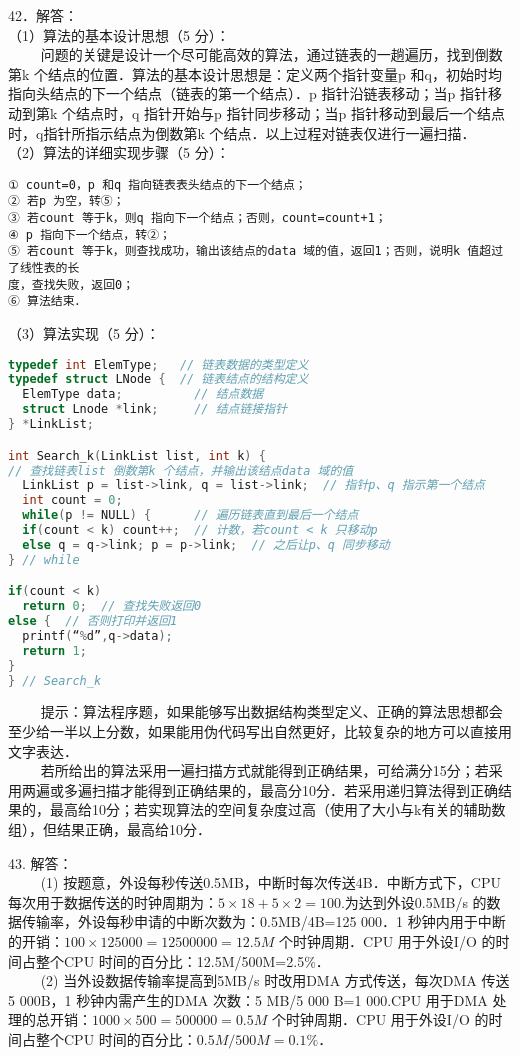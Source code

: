 42．解答： \\
（1）算法的基本设计思想（5 分）： \\
$\qquad$ 问题的关键是设计一个尽可能高效的算法，通过链表的一趟遍历，找到倒数第k 个结点的位置．算法的基本设计思想是：定义两个指针变量p 和q，初始时均指向头结点的下一个结点（链表的第一个结点）．p 指针沿链表移动；当p 指针移动到第k 个结点时，q 指针开始与p 指针同步移动；当p 指针移动到最后一个结点时，q指针所指示结点为倒数第k 个结点．以上过程对链表仅进行一遍扫描． \\
（2）算法的详细实现步骤（5 分）： 
\begin{lstlisting}[language=none]
① count=0，p 和q 指向链表表头结点的下一个结点；
② 若p 为空，转⑤；
③ 若count 等于k，则q 指向下一个结点；否则，count=count+1；
④ p 指向下一个结点，转②；
⑤ 若count 等于k，则查找成功，输出该结点的data 域的值，返回1；否则，说明k 值超过了线性表的长
度，查找失败，返回0；
⑥ 算法结束．
\end{lstlisting}
（3）算法实现（5 分）： \\
\begin{lstlisting}[language=cpp]
typedef int ElemType;   // 链表数据的类型定义
typedef struct LNode {  // 链表结点的结构定义
  ElemType data;          // 结点数据
  struct Lnode *link;     // 结点链接指针
} *LinkList;

int Search_k(LinkList list, int k) {
// 查找链表list 倒数第k 个结点，并输出该结点data 域的值
  LinkList p = list->link, q = list->link;  // 指针p、q 指示第一个结点
  int count = 0;
  while(p != NULL) {      // 遍历链表直到最后一个结点
  if(count < k) count++;  // 计数，若count < k 只移动p
  else q = q->link; p = p->link;  // 之后让p、q 同步移动
} // while

if(count < k)
  return 0;  // 查找失败返回0
else {  // 否则打印并返回1
  printf(“%d”,q->data);
  return 1;
}
} // Search_k
\end{lstlisting}
$\qquad$ 提示：算法程序题，如果能够写出数据结构类型定义、正确的算法思想都会至少给一半以上分数，如果能用伪代码写出自然更好，比较复杂的地方可以直接用文字表达． \\
$\qquad$ 若所给出的算法采用一遍扫描方式就能得到正确结果，可给满分15分；若采用两遍或多遍扫描才能得到正确结果的，最高分10分．若采用递归算法得到正确结果的，最高给10分；若实现算法的空间复杂度过高（使用了大小与k有关的辅助数组），但结果正确，最高给10分．

43. 解答： \\
$\qquad$ (1) 按题意，外设每秒传送0.5MB，中断时每次传送4B．中断方式下，CPU 每次用于数据传送的时钟周期为：$5\times18+5\times2=100$.为达到外设0.5MB/s 的数据传输率，外设每秒申请的中断次数为：0.5MB/4B=125 000．1 秒钟内用于中断的开销：$100\times125 000=12 500 000=12.5M$ 个时钟周期．CPU 用于外设I/O 的时间占整个CPU 时间的百分比：12.5M/500M=2.5\%． \\
$\qquad$ (2) 当外设数据传输率提高到5MB/s 时改用DMA 方式传送，每次DMA 传送5 000B，1 秒钟内需产生的DMA 次数：5 MB/5 000 B=1 000.CPU 用于DMA 处理的总开销：$1 000\times500=500 000=0.5M$ 个时钟周期．CPU 用于外设I/O 的时间占整个CPU 时间的百分比：$0.5M/500M=0.1\%$．

